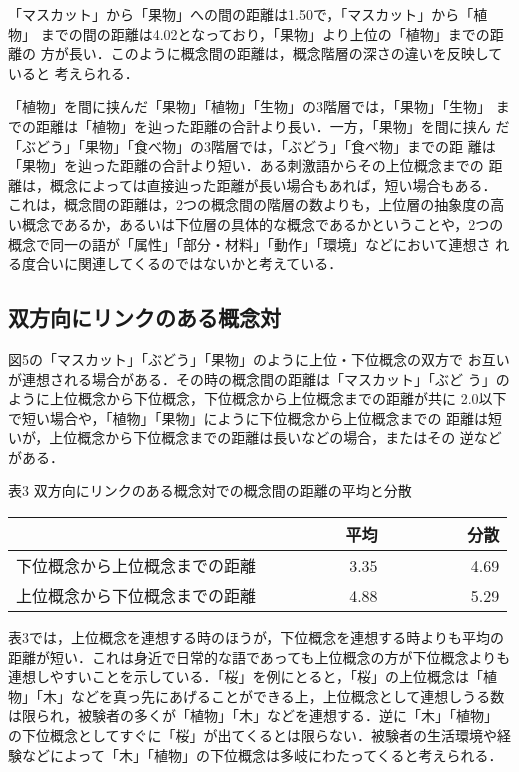 「マスカット」から「果物」への間の距離は1.50で，「マスカット」から「植物」
までの間の距離は4.02となっており，「果物」より上位の「植物」までの距離の
方が長い．このように概念間の距離は，概念階層の深さの違いを反映していると
考えられる．

「植物」を間に挟んだ「果物」「植物」「生物」の3階層では，「果物」「生物」
までの距離は「植物」を辿った距離の合計より長い．一方，「果物」を間に挟ん
だ「ぶどう」「果物」「食べ物」の3階層では，「ぶどう」「食べ物」までの距
離は「果物」を辿った距離の合計より短い．ある刺激語からその上位概念までの
距離は，概念によっては直接辿った距離が長い場合もあれば，短い場合もある．
これは，概念間の距離は，2つの概念間の階層の数よりも，上位層の抽象度の高
い概念であるか，あるいは下位層の具体的な概念であるかということや，2つの
概念で同一の語が「属性」「部分・材料」「動作」「環境」などにおいて連想さ
れる度合いに関連してくるのではないかと考えている．

\subsection{双方向にリンクのある概念対}

図5の「マスカット」「ぶどう」「果物」のように上位・下位概念の双方で
お互いが連想される場合がある．その時の概念間の距離は「マスカット」「ぶど
う」のように上位概念から下位概念，下位概念から上位概念までの距離が共に
2.0以下で短い場合や，「植物」「果物」にように下位概念から上位概念までの
距離は短いが，上位概念から下位概念までの距離は長いなどの場合，またはその
逆などがある．

\begin{center}

表3 双方向にリンクのある概念対での概念間の距離の平均と分散
\vspace*{1ex}

\begin{tabular}{|l|r|r|}\hline
&~~~~~~~~平均&~~~~~~~~分散\\ \hline
下位概念から上位概念までの距離&3.35&4.69\\ \hline
上位概念から下位概念までの距離&4.88&5.29\\ \hline
\end{tabular}
\end{center}

\vspace*{1ex}

表3では，上位概念を連想する時のほうが，下位概念を連想する時よりも平均の
距離が短い．これは身近で日常的な語であっても上位概念の方が下位概念よりも
連想しやすいことを示している．「桜」を例にとると，「桜」の上位概念は「植
物」「木」などを真っ先にあげることができる上，上位概念として連想しうる数
は限られ，被験者の多くが「植物」「木」などを連想する．逆に「木」「植物」
の下位概念としてすぐに「桜」が出てくるとは限らない．被験者の生活環境や経
験などによって「木」「植物」の下位概念は多岐にわたってくると考えられる．

